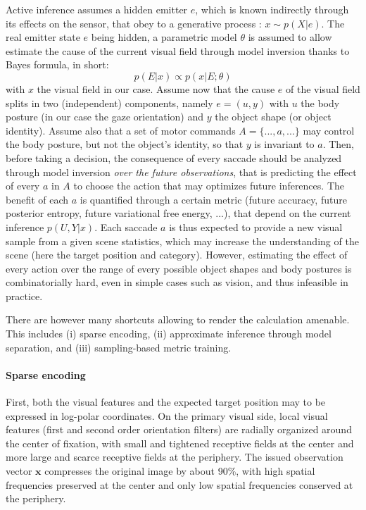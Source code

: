 Active inference assumes a hidden emitter $e$, which is known indirectly through its effects on the sensor, that obey to a generative process : $x\sim p(X|e)$. The real emitter state $e$ being hidden, a parametric model $\theta$ is assumed to allow estimate the cause of the current visual field through model inversion thanks to Bayes formula, in short:
$$p(E|x) \propto p(x|E;\theta)$$
with $x$ the visual field in our case. Assume now that the cause $e$ of the visual field splits in two (independent) components, namely $e = (u,y)$ with $u$ the body posture (in our case the gaze orientation) and $y$ the object shape (or object identity). Assume also that a set of motor commands $A = \{..., a, ...\}$ may control the body posture, but not the object's identity, so that $y$ is invariant to $a$.
Then, before taking a decision, the consequence of every saccade should be analyzed  through model inversion \emph{over the future observations}, that is predicting the effect of every $a$ in $A$ to choose the action that may optimizes future inferences. The benefit of each $a$ is quantified through a certain metric (future accuracy, future posterior entropy, future variational free energy, ...), that depend on the current inference $p(U,Y|x)$. Each saccade $a$ is thus expected to provide a new visual sample from a given scene statistics, which may increase the understanding of the scene (here the target position and category). However, estimating the effect of every action over the range of every possible object shapes and body postures is combinatorially hard, even in simple cases such as vision, and thus infeasible in practice. 



There are however many shortcuts allowing to render the calculation amenable. This includes (i) sparse encoding, (ii) approximate inference through model separation, and (iii) sampling-based metric training. 

\paragraph{Sparse encoding}
First, both the visual features and the expected target position may to be expressed in log-polar coordinates. On the primary visual side, local visual features (first and second order orientation filters) are radially organized around the center of fixation, with small and tightened receptive fields at the center and more large and scarce receptive fields at the periphery. The issued observation vector $\boldsymbol{x}$ compresses the original image by about 90\%, with high spatial frequencies preserved at the center and only low spatial frequencies conserved at the periphery.

